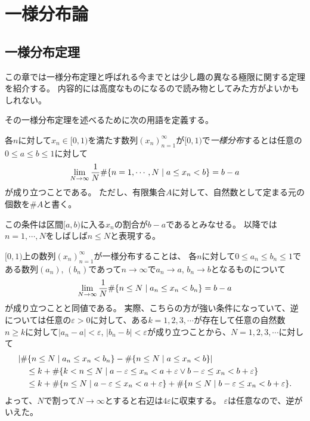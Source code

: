 
\chapter{一様分布論}

\section{一様分布定理}

この章では一様分布定理と呼ばれる今までとは少し趣の異なる極限に関する定理を紹介する。
内容的には高度なものになるので読み物としてみた方がよいかもしれない。

その一様分布定理を述べるために次の用語を定義する。

\begin{definition}[一様分布列]
各$n$に対して$x_n \in [0, 1)$を満たす数列$(x_n)_{n = 1}^\infty$が$[0, 1)$で\emph{一様分布}するとは任意の$0 \le a \le b \le 1$に対して
\begin{equation}
\label{e_equidist}
\lim_{N \to \infty}\frac{1}{N}\#\{ n = 1, \cdots, N \mid a \le x_n < b \} = b-a
\end{equation}
が成り立つことである。
ただし、有限集合$A$に対して、自然数として定まる元の個数を$\# A$と書く。
\end{definition}

この条件は区間$[a, b)$に入る$x_n$の割合が$b-a$であるとみなせる。
以降では$n = 1, \cdots, N$をしばしば$n \le N$と表現する。

\begin{remark}
$[0, 1)$上の数列$(x_n)_{n = 1}^\infty$が一様分布することは、
各$n$に対して$0 \le a_n \le b_n \le 1$である数列$(a_n)$, $(b_n)$であって$n \to \infty$で$a_n \to a$, $b_n \to b$となるものについて
$$
\lim_{N \to \infty}\frac{1}{N}\#\{ n \le N \mid a_n \le x_n < b_n \} = b-a
$$
が成り立つことと同値である。
実際、こちらの方が強い条件になっていて、逆については任意の$\varepsilon > 0$に対して、ある$k = 1, 2, 3, \cdots$が存在して任意の自然数$n \ge k$に対して$|a_n-a| < \varepsilon$, $|b_n-b| < \varepsilon$が成り立つことから、$N = 1, 2, 3, \cdots$に対して
$$
\begin{aligned}
&\abs{\#\{ n \le N \mid a_n \le x_n < b_n \}-\#\{ n \le N \mid a \le x_n < b \}} \\
&\quad \le k+\#\{ k < n \le N \mid a-\varepsilon \le x_n < a+\varepsilon \lor b-\varepsilon \le x_n < b+\varepsilon \} \\
&\quad \le k+\#\{ n \le N \mid a-\varepsilon \le x_n < a+\varepsilon \}+\#\{ n \le N \mid b-\varepsilon \le x_n < b+\varepsilon \}.
\end{aligned}
$$
よって、$N$で割って$N \to \infty$とすると右辺は$4\varepsilon$に収束する。
$\varepsilon$は任意なので、逆がいえた。
\end{remark}

